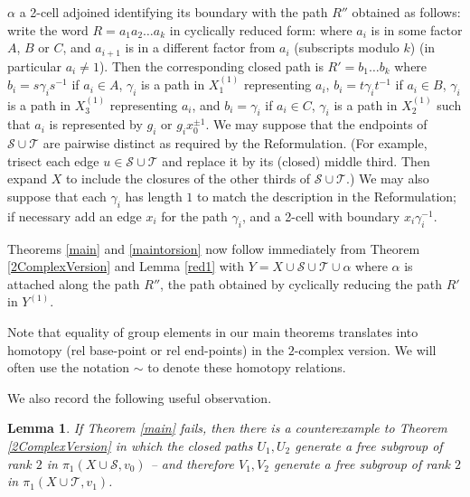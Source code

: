 \documentclass[12pt,a4paper]{amsart}
\def\a{\alpha}
\def\g{\gamma}
\def\cS{\mathcal{S}}
\def\cT{\mathcal{T}}
\newtheorem{lem}[thm]{Lemma}
\begin{document}
$\alpha$ a 2-cell adjoined identifying its boundary with the path $R''$ obtained as follows:
write the word
	$R=a_1a_2\dots a_k$ in cyclically reduced form: where $a_i$ is in some factor $A$, $B$ or $C$, 
and $a_{i+1}$  is in a different factor from $a_i$ (subscripts modulo $k$)  
(in particular $a_i\neq 1$). 
Then the  	corresponding closed path is 
	 $R'= b_1\dots b_k$ where $b_i=s\g_is^{-1}$ if $a_i\in A$, $\g_i$ is a path in $X_1^{(1)}$ representing $a_i$, $b_i=t\g_it^{-1}$ if $a_i\in B$, $\g_i$ is a path in $X_3^{(1)}$ representing $a_i$, and
$b_i=\g_i$ if $a_i\in C$, $\g_i$ is a path in $X_2^{(1)}$ 
such that $a_i$ is represented by $g_i$ or $g_ix_0^{\pm1}$. 
 We may suppose that the endpoints of $\cS\cup\cT$ are pairwise distinct as required by the Reformulation.  (For example, trisect each edge $u\in\cS\cup\cT$ and replace it by its (closed) middle third. Then expand $X$ to include the closures of the other thirds of $\cS\cup\cT$.)  We may  also suppose that each $\g_i$ 
 has length $1$  to match the description in the Reformulation;
if necessary add an edge $x_i$ for the path $\g_i$,
and a 2-cell with boundary  $x_i \g_i^{-1}$. 

Theorems \ref{main} and \ref{maintorsion} now follow immediately from Theorem \ref{2ComplexVersion} 
and Lemma \ref{red1}
with $Y= X\cup\cS\cup\cT\cup\alpha$   where $\a$ is
attached along the path $R''$, the path obtained by cyclically reducing the path $R'$ in $Y^{(1)}$.
  
 Note that equality of group elements in our main theorems translates into homotopy (rel base-point or rel end-points) in the $2$-complex version.  We will often use the notation $\sim$ to denote these homotopy relations.
 
  We also record the following useful observation.
\begin{lem}
If Theorem \ref{main} fails, then there is a counterexample to Theorem \ref{2ComplexVersion} in which the closed paths $U_1,U_2$ generate a free subgroup of rank $2$ in $\pi_1(X\cup\cS,v_0)$ -- and therefore $V_1,V_2$ generate a free subgroup of rank $2$ in $\pi_1(X\cup\cT,v_1)$.
\end{lem} 	
\end{document}
